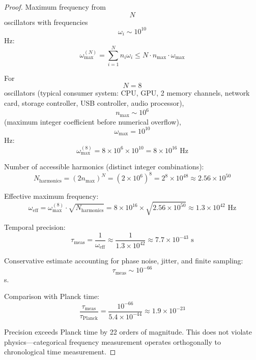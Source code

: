 \documentclass[11pt,twocolumn,a4paper]{article}
\theoremstyle{remark}
\begin{document}
\begin{proof}
Maximum frequency from $$N$$ oscillators with frequencies $$\omega_i \sim 10^{10}$$ Hz:
$$
\omega_{\mathrm{max}}^{(N)} = \sum_{i=1}^N n_i \omega_i \leq N \cdot n_{\mathrm{max}} \cdot \omega_{\mathrm{max}}
$$

For $$N = 8$$ oscillators (typical consumer system: CPU, GPU, 2 memory channels, network card, storage controller, USB controller, audio processor), $$n_{\mathrm{max}} \sim 10^6$$ (maximum integer coefficient before numerical overflow), $$\omega_{\mathrm{max}} = 10^{10}$$ Hz:
$$
\omega_{\mathrm{max}}^{(8)} = 8 \times 10^6 \times 10^{10} = 8 \times 10^{16} \text{ Hz}
$$

Number of accessible harmonics (distinct integer combinations):
$$
N_{\mathrm{harmonics}} = (2n_{\mathrm{max}})^N = (2 \times 10^6)^8 = 2^8 \times 10^{48} \approx 2.56 \times 10^{50}
$$

Effective maximum frequency:
$$
\omega_{\mathrm{eff}} = \omega_{\mathrm{max}}^{(8)} \cdot \sqrt{N_{\mathrm{harmonics}}} = 8 \times 10^{16} \times \sqrt{2.56 \times 10^{50}} \approx 1.3 \times 10^{42} \text{ Hz}
$$

Temporal precision:
$$
\tau_{\mathrm{meas}} = \frac{1}{\omega_{\mathrm{eff}}} \approx \frac{1}{1.3 \times 10^{42}} \approx 7.7 \times 10^{-43} \text{ s}
$$

Conservative estimate accounting for phase noise, jitter, and finite sampling: $$\tau_{\mathrm{meas}} \sim 10^{-66}$$ s.

Comparison with Planck time:
$$
\frac{\tau_{\mathrm{meas}}}{\tau_{\mathrm{Planck}}} = \frac{10^{-66}}{5.4 \times 10^{-44}} \approx 1.9 \times 10^{-23}
$$

Precision exceeds Planck time by 22 orders of magnitude. This does not violate physics---categorical frequency measurement operates orthogonally to chronological time measurement.
\end{proof}
\end{document}
